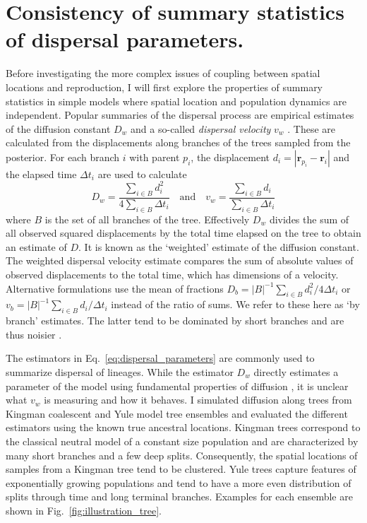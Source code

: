 \documentclass[aps,rmp, twocolumn]{revtex4}
\newcommand{\rvec}{\mathbf{r}}
\begin{document}
\section*{Consistency of summary statistics of dispersal parameters.}
Before investigating the more complex issues of coupling between spatial locations and reproduction, I will first explore the properties of summary statistics in simple models where spatial location and population dynamics are independent.
Popular summaries of the dispersal process are empirical estimates of the diffusion constant $D_w$ \citep{pybus_unifying_2012,trovao_bayesian_2015} and a so-called \emph{dispersal velocity} $v_w$ \citep{lemey_phylogeography_2010,raghwani_endemic_2011}.
These are calculated from the displacements along branches of the trees sampled from the posterior.
For each branch $i$ with parent $p_i$, the displacement $d_i = |\rvec_{p_i} - \rvec_{i}|$ and the elapsed time $\Delta t_i$ are used to calculate
\begin{equation}
    \label{eq:dispersal_parameters}
    D_w = \frac{\sum_{i\in B}d_i^2}{4\sum_{i\in B} \Delta t_i} \quad \mathrm{and}  \quad v_w = \frac{\sum_{i\in B} d_i}{\sum_{i\in B} \Delta t_i}
\end{equation}
where $B$ is the set of all branches of the tree.
Effectively $D_w$ divides the sum of all observed squared displacements by the total time elapsed on the tree to obtain an estimate of $D$.
It is known as the `weighted' estimate of the diffusion constant.
The weighted dispersal velocity estimate compares the sum of absolute values of observed displacements to the total time, which has dimensions of a velocity.
Alternative formulations use the mean of fractions $D_b = |B|^{-1} \sum_{i\in B}d_i^2/4\Delta t_i$ or $v_b = |B|^{-1} \sum_{i\in B}d_i/\Delta t_i$ instead of the ratio of sums.
We refer to these here as `by branch' estimates.
The latter tend to be dominated by short branches and are thus noisier \citep{trovao_bayesian_2015}.

The estimators in Eq.~\ref{eq:dispersal_parameters} are commonly used to summarize dispersal of lineages.
While the estimator $D_w$ directly estimates a parameter of the model using fundamental properties of diffusion \citep{pybus_unifying_2012}, it is unclear what $v_w$ is measuring and how it behaves.
I simulated diffusion along trees from Kingman coalescent \citep{kingman_coalescent_1982} and Yule model \citep{yule_iimathematical_1925} tree ensembles and evaluated the different estimators using the known true ancestral locations.
Kingman trees correspond to the classical neutral model of a constant size population and are characterized by many short branches and a few deep splits.
Consequently, the spatial locations of samples from a Kingman tree tend to be clustered.
Yule trees capture features of exponentially growing populations and tend to have a more even distribution of splits through time and long terminal branches.
Examples for each ensemble are shown in Fig.~\ref{fig:illustration_tree}.
\end{document}
